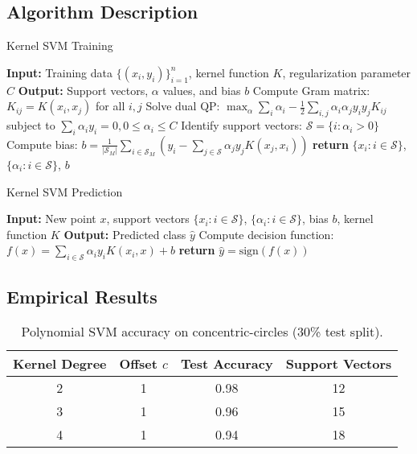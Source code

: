 \documentclass[11pt]{article}
\begin{document}
\subsection{Algorithm Description}
\begin{algorithm}
\caption{Kernel SVM Training}
\begin{algorithmic}[1]
\State \textbf{Input:} Training data $\{(x_i, y_i)\}_{i=1}^n$, kernel function $K$, regularization parameter $C$
\State \textbf{Output:} Support vectors, $\alpha$ values, and bias $b$
\State Compute Gram matrix: $K_{ij} = K(x_i, x_j)$ for all $i,j$
\State Solve dual QP: $\max_{\alpha} \sum_i \alpha_i - \frac{1}{2}\sum_{i,j}\alpha_i\alpha_j y_i y_j K_{ij}$ subject to $\sum_i \alpha_i y_i=0, 0 \leq \alpha_i \leq C$
\State Identify support vectors: $\mathcal{S} = \{i : \alpha_i > 0\}$
\State Compute bias: $b = \frac{1}{|\mathcal{S}_M|}\sum_{i \in \mathcal{S}_M} \left(y_i - \sum_{j \in \mathcal{S}} \alpha_j y_j K(x_j, x_i)\right)$
\State \textbf{return} $\{x_i : i \in \mathcal{S}\}$, $\{\alpha_i : i \in \mathcal{S}\}$, $b$
\end{algorithmic}
\end{algorithm}

\begin{algorithm}
\caption{Kernel SVM Prediction}
\begin{algorithmic}[1]
\State \textbf{Input:} New point $x$, support vectors $\{x_i : i \in \mathcal{S}\}$, $\{\alpha_i : i \in \mathcal{S}\}$, bias $b$, kernel function $K$
\State \textbf{Output:} Predicted class $\hat{y}$
\State Compute decision function: $f(x) = \sum_{i \in \mathcal{S}} \alpha_i y_i K(x_i, x) + b$
\State \textbf{return} $\hat{y} = \text{sign}(f(x))$
\end{algorithmic}
\end{algorithm}

\subsection{Empirical Results}
\begin{table}[h]
  \centering
  \begin{tabular}{c c c c}
    \hline
    Kernel Degree & Offset $c$ & Test Accuracy & Support Vectors \\
    \hline
    2 & 1 & 0.98 & 12 \\
    3 & 1 & 0.96 & 15 \\
    4 & 1 & 0.94 & 18 \\
    \hline
  \end{tabular}
  \caption{Polynomial SVM accuracy on concentric-circles (30\% test split).}
\end{table}
\end{document}

